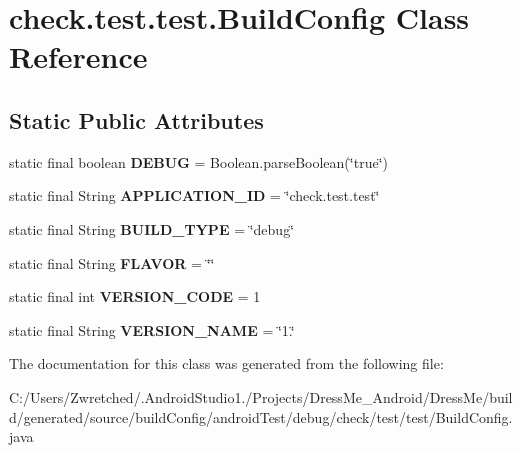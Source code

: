 \hypertarget{classcheck_1_1test_1_1test_1_1_build_config}{}\section{check.\+test.\+test.\+Build\+Config Class Reference}
\label{classcheck_1_1test_1_1test_1_1_build_config}
\subsection*{Static Public Attributes}
\begin{DoxyCompactItemize}
\item 
\hypertarget{classcheck_1_1test_1_1test_1_1_build_config_a03bb7e7b4e9182654baf1aaeff3a0c28}{}static final boolean {\bfseries D\+E\+B\+U\+G} = Boolean.\+parse\+Boolean(\char`\"{}true\char`\"{})\label{classcheck_1_1test_1_1test_1_1_build_config_a03bb7e7b4e9182654baf1aaeff3a0c28}

\item 
\hypertarget{classcheck_1_1test_1_1test_1_1_build_config_ac41aabfc44167a0e1d6bb5ba59f3a469}{}static final String {\bfseries A\+P\+P\+L\+I\+C\+A\+T\+I\+O\+N\+\_\+\+I\+D} = \char`\"{}check.\+test.\+test\char`\"{}\label{classcheck_1_1test_1_1test_1_1_build_config_ac41aabfc44167a0e1d6bb5ba59f3a469}

\item 
\hypertarget{classcheck_1_1test_1_1test_1_1_build_config_a6eed8679db93442aa2864fc688836328}{}static final String {\bfseries B\+U\+I\+L\+D\+\_\+\+T\+Y\+P\+E} = \char`\"{}debug\char`\"{}\label{classcheck_1_1test_1_1test_1_1_build_config_a6eed8679db93442aa2864fc688836328}

\item 
\hypertarget{classcheck_1_1test_1_1test_1_1_build_config_a6a17ee45301eb866476fad1028691be8}{}static final String {\bfseries F\+L\+A\+V\+O\+R} = \char`\"{}\char`\"{}\label{classcheck_1_1test_1_1test_1_1_build_config_a6a17ee45301eb866476fad1028691be8}

\item 
\hypertarget{classcheck_1_1test_1_1test_1_1_build_config_a5e3884808704a73f2a319fc2baf8451f}{}static final int {\bfseries V\+E\+R\+S\+I\+O\+N\+\_\+\+C\+O\+D\+E} = 1\label{classcheck_1_1test_1_1test_1_1_build_config_a5e3884808704a73f2a319fc2baf8451f}

\item 
\hypertarget{classcheck_1_1test_1_1test_1_1_build_config_ad67414a7e5d57ed698119a7f9ce9bdc0}{}static final String {\bfseries V\+E\+R\+S\+I\+O\+N\+\_\+\+N\+A\+M\+E} = \char`\"{}1.\char`\"{}\label{classcheck_1_1test_1_1test_1_1_build_config_ad67414a7e5d57ed698119a7f9ce9bdc0}

\end{DoxyCompactItemize}


The documentation for this class was generated from the following file\+:\begin{DoxyCompactItemize}
\item 
C\+:/\+Users/\+Zwretched/.\+Android\+Studio1./\+Projects/\+Dress\+Me\+\_\+\+Android/\+Dress\+Me/build/generated/source/build\+Config/android\+Test/debug/check/test/test/Build\+Config.\+java\end{DoxyCompactItemize}
